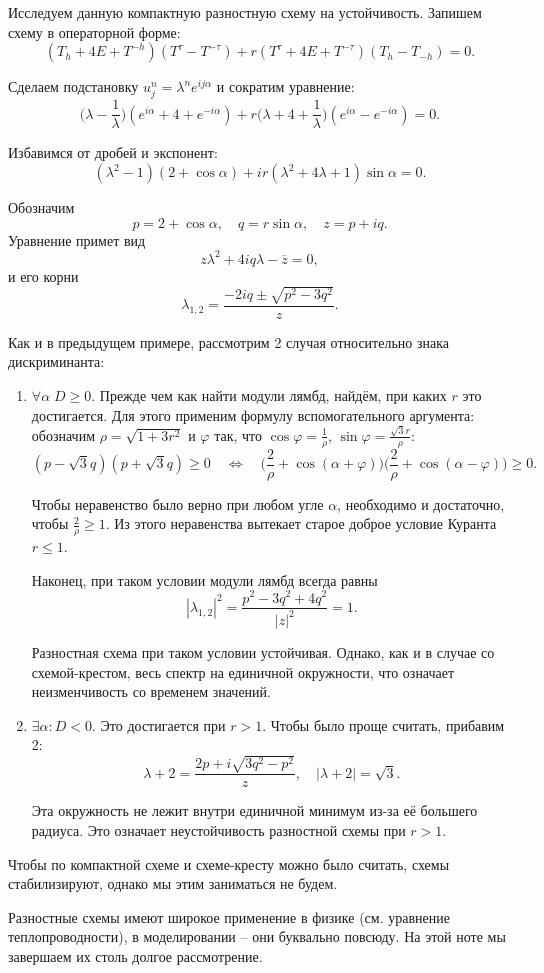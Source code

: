 \documentclass{article}
\begin{document}
\begin{example}
	Исследуем данную компактную разностную схему на устойчивость. Запишем
	схему в операторной форме:
	\[(T_h+4E+T^{-h})(T^\tau-T^{-\tau})+r(T^\tau+4E+T^{-\tau})(T_h-T_{-h})
	=0.\]

	Сделаем подстановку $u_j^n=\lambda^ne^{ij\alpha}$ и сократим уравнение:
	\[\Big(\lambda-\frac{1}{\lambda}\Big)(e^{i\alpha}+4+e^{-i\alpha})+
	r\Big(\lambda+4+\frac{1}{\lambda}\Big)(e^{i\alpha}-e^{-i\alpha})=0.\]

	Избавимся от дробей и экспонент:
	\[(\lambda^2-1)(2+\cos\alpha)+ir(\lambda^2+4\lambda+1)\sin\alpha=0.\]

	Обозначим
	\[p=2+\cos\alpha,\quad q=r\sin\alpha,\quad z=p+iq.\]
	Уравнение примет вид
	\[z\lambda^2+4iq\lambda-\overline{z}=0,\]
	и его корни
	\[\lambda_{1,2}=\frac{-2iq\pm\sqrt{p^2-3q^2}}{z}.\]

	Как и в предыдущем примере, рассмотрим 2 случая относительно знака
	дискриминанта:
	\begin{enumerate}[nosep]
		\item $\forall \alpha\; D\ge 0$. Прежде чем как найти модули
			лямбд, найдём, при каких $r$ это достигается. Для этого
			применим формулу вспомогательного аргумента: обозначим
			$\rho=\sqrt{1+3r^2}$ и $\varphi$ так, что
			$\cos\varphi=\frac{1}{\rho}$,
			$\sin\varphi=\frac{\sqrt{3}r}{\rho}$:
			\[(p-\sqrt 3 q)(p+\sqrt3 q)\ge 0\quad\Leftrightarrow
			\quad\Big(\frac{2}{\rho}+\cos(\alpha+\varphi)\Big)
			\Big(\frac{2}{\rho}+\cos(\alpha-\varphi)\Big)\ge 0.\]

			Чтобы неравенство было верно при любом угле $\alpha$,
			необходимо и достаточно, чтобы $\frac{2}{\rho}\ge 1$.
			Из этого неравенства вытекает старое доброе условие
			Куранта $r\le 1$.

			Наконец, при таком условии модули лямбд всегда равны
			\[|\lambda_{1,2}|^2=\frac{p^2-3q^2+4q^2}{|z|^2}=1.\]

			Разностная схема при таком условии устойчивая. Однако,
			как и в случае со схемой-крестом, весь спектр на
			единичной окружности, что означает неизменчивость
			со временем значений.

		\item $\exists \alpha: D<0$. Это достигается при $r>1$.
			Чтобы было проще считать, прибавим 2:
			\[\lambda+2=\frac{2p+i\sqrt{3q^2-p^2}}{z},\quad
			|\lambda+2|=\sqrt 3.\]

			Эта окружность не лежит внутри единичной минимум из-за
			её большего радиуса. Это означает неустойчивость
			разностной схемы при $r>1$.
	\end{enumerate}
\end{example}

Чтобы по компактной схеме и схеме-кресту можно было считать, схемы
стабилизируют, однако мы этим заниматься не будем.

Разностные схемы имеют широкое применение в физике (см. уравнение
теплопроводности), в моделировании -- они буквально повсюду. На этой
ноте мы завершаем их столь долгое рассмотрение.
\end{document}
